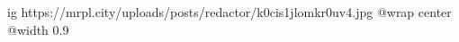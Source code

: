  
 
 
 
 

\ifcmt
  ig https://mrpl.city/uploads/posts/redactor/k0cis1jlomkr0uv4.jpg
  @wrap center
  @width 0.9
\fi
